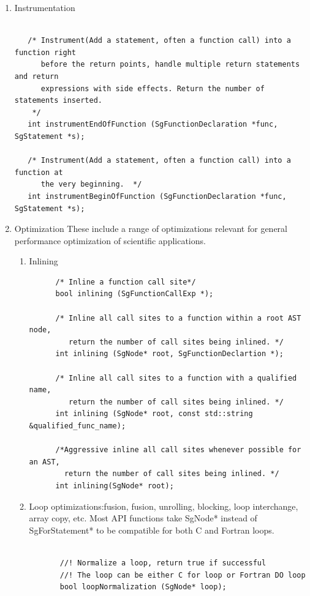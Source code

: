 \begin{enumerate}
   \item Instrumentation 
   \begin{lstlisting}

   /* Instrument(Add a statement, often a function call) into a function right
      before the return points, handle multiple return statements and return
      expressions with side effects. Return the number of statements inserted.
    */
   int instrumentEndOfFunction (SgFunctionDeclaration *func, SgStatement *s);

   /* Instrument(Add a statement, often a function call) into a function at
      the very beginning.  */
   int instrumentBeginOfFunction (SgFunctionDeclaration *func, SgStatement *s);
   \end{lstlisting}
   \item Optimization
         These include a range of optimizations relevant for general performance
         optimization of scientific applications.
   \begin{enumerate}
      \item Inlining
      \begin{lstlisting}
      /* Inline a function call site*/
      bool inlining (SgFunctionCallExp *);

      /* Inline all call sites to a function within a root AST node,
         return the number of call sites being inlined. */
      int inlining (SgNode* root, SgFunctionDeclartion *);

      /* Inline all call sites to a function with a qualified name,
         return the number of call sites being inlined. */
      int inlining (SgNode* root, const std::string &qualified_func_name);

      /*Aggressive inline all call sites whenever possible for an AST,
        return the number of call sites being inlined. */
      int inlining(SgNode* root);

      \end{lstlisting}
      \item Loop optimizations:fusion, fusion, unrolling, blocking, loop
                  interchange, array copy, etc.
Most API functions take SgNode* instead of SgForStatement* to be compatible for both C and Fortran loops.
       \begin{lstlisting}

       //! Normalize a loop, return true if successful
       //! The loop can be either C for loop or Fortran DO loop
       bool loopNormalization (SgNode* loop);


\end{lstlisting}
\end{enumerate}
\end{enumerate}
